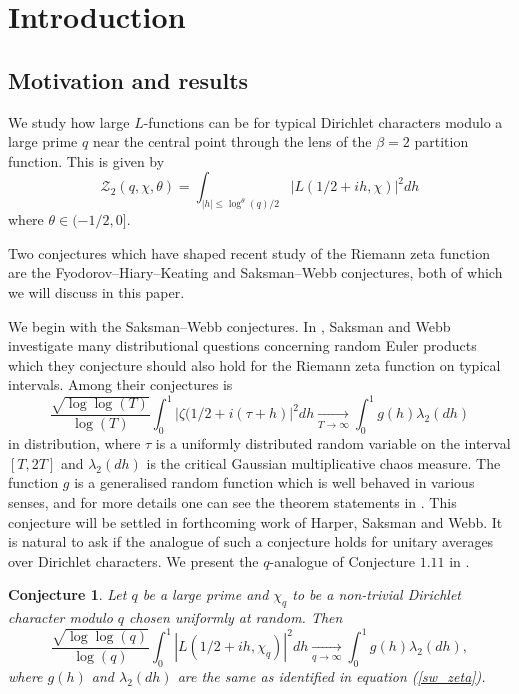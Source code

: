 \documentclass[reqno]{amsart}
\newtheorem{conjecture}{Conjecture}
\theoremstyle{definition}
\theoremstyle{remark}
\numberwithin{equation}{section}
\theoremstyle{remark}
\begin{document}
\section{Introduction} \subsection{Motivation and results}
We study how large $L$-functions can be for typical Dirichlet characters modulo a large prime $q$ near the central point through the lens of the $\beta=2$ partition function. This is given by
\begin{equation}
    \mathcal{Z}_2(q,\chi,\theta)=\int_{|h| \leq \log^{\theta}(q)/2}|L(1/2+ih,\chi)|^2dh
\end{equation}
where $\theta \in (-1/2,0]$. \par
Two conjectures which have shaped recent study of the Riemann zeta function are the Fyodorov--Hiary--Keating and Saksman--Webb conjectures, both of which we will discuss in this paper. \par
We begin with the Saksman--Webb conjectures. In \cite{sw20}, Saksman and Webb investigate many distributional questions concerning random Euler products which they conjecture should also hold for the Riemann zeta function on typical intervals. Among their conjectures is 
\begin{equation} \label{sw_zeta}
    \frac{\sqrt{\log\log(T)}}{\log(T)}\int_0^1|\zeta(1/2+i(\tau+h)|^2dh \underset{T \rightarrow \infty}{\longrightarrow} \int_0^1g(h)\lambda_2(dh)
\end{equation}
in distribution, where $\tau$ is a uniformly distributed random variable on the interval $[T,2T]$ and $\lambda_2(dh)$ is the critical Gaussian multiplicative chaos measure. The function $g$ is a generalised random function which is well behaved in various senses, and for more details one can see the theorem statements in \cite{sw20}. This conjecture will be settled in forthcoming work of Harper, Saksman and Webb. It is natural to ask if the analogue of such a conjecture holds for unitary averages over Dirichlet characters. We present the $q$-analogue of Conjecture $1.11$ in \cite{sw20}.
\begin{conjecture} \label{q-aspect_partition_conjecture}
Let $q$ be a large prime and $\chi_q$ to be a non-trivial Dirichlet character modulo $q$ chosen uniformly at random. Then
    $$\frac{\sqrt{\log\log(q)}}{\log(q)}\int_0^1|L(1/2+ih,\chi_q)|^2dh \underset{q \rightarrow \infty}{\longrightarrow} \int_0^1g(h)\lambda_2(dh),$$
    where $g(h)$ and $\lambda_2(dh)$ are the same as identified in equation (\ref{sw_zeta}).
\end{conjecture}
\end{document}
